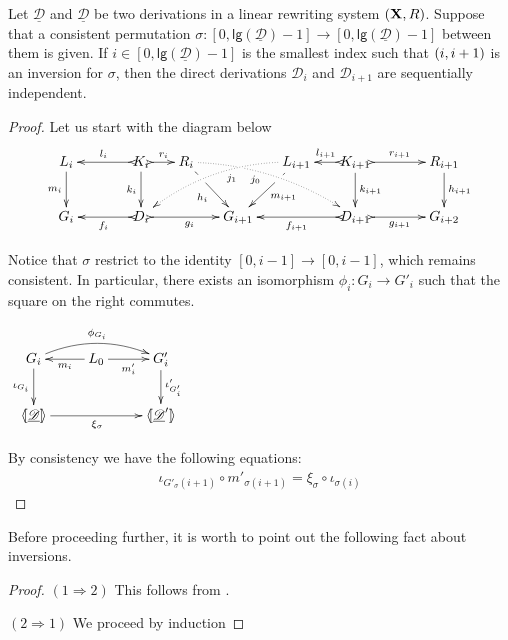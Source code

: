 \documentclass[a4paper,UKenglish,cleveref,pdftex, thm-restate,numberwithinsect,anonymous]{lipics}
\def\R{\mathsf{R}}
\def\X{\textbf {\textup{X}}}
\def\G{\textbf {\textup{G}}}
\newcommand{\dder}[1]{\mathscr{#1}}
\newcommand{\der}[1]{\underline{\dder{#1}}}
\newcommand{\lpro}{\langle \hspace{-1.85pt}[}
\newcommand{\rpro}{]\hspace{-1.85pt}\rangle}
\newcommand{\tpro}[1]{\lpro \der{#1}\rpro}
\newcommand{\lgh}[0]{\mathsf{lg}}
\begin{document}
\begin{lemma}
	Let $\der{D}$ and $\der{D}$ be two derivations in a linear rewriting system $(\X, \R)$. Suppose that a consistent permutation $\sigma:[0, \lgh(\der{D})-1]\to [0, \lgh(\der{D})-1]$ between them is given. If $i\in [0, \lgh(\der{D})-1]$ is the smallest index such that $\transp{i}$ is an inversion for $\sigma$, then the direct derivations $\dder{D}_i$ and $\dder{D}_{i+1}$ are sequentially independent.
\end{lemma}
\begin{proof}
	Let us start with the diagram below
	  \[\xymatrix@C=15pt{L_i \ar[d]_{m_i}&& K_i
		\ar[d]_{k_i}\ar@{>->}[ll]_{l_i} \ar@{>->}[r]^{r_i} & R_i
		\ar@{.>}@/^.35cm/[drrr]|(.3)\hole_(.4){j_0}
		\ar[dr]|(.3)\hole_{h_i} && L_{i+1} \ar@{.>}@/_.4cm/[dlll]^(.4){j_1}
		\ar[dl]|(.3)\hole^{m_{i+1}}& K_{i+1} \ar[d]^{k_{i+1}}\ar@{>->}[l]_{l_{i+1}}
		\ar@{>->}[rr]^{r_{i+1}} && R_{i+1} \ar[d]^{h_{i+1}}\\G_i && \ar@{>->}[ll]^{f_i}
		D_i \ar@{>->}[rr]_{g_i}&& G_{i+1} && \ar@{>->}[ll]^{f_{i+1}} D_{i+1}\ar@{>->}[rr]_{g_{i+1}}&& G_{i+2}}\]
	\parbox{9cm}{Notice that $\sigma$ restrict to the identity $[0, i-1]\to [0,i-1]$, which remains consistent. In particular, there exists an isomorphism $\phi_{i}\colon G_i\to G'_i$ such that the square on the right commutes.}
	\parbox{3cm}{\vspace{-.5cm}$\xymatrix{G_i \ar[d]_{\iota_{G_i}}\ar@/^.4cm/[rr]^{\phi_{G_i}}& L_0  \ar[l]^{m_i}\ar[r]_{m'_{i}} & G'_{i} \ar[d]^{\iota'_{G'_i}}\\ \tpro{D} \ar[rr]_{\xi_\sigma} & &\lpro\der{D}'\rpro  }$}
	
	
	
	
	By consistency we have the following equations:
	\[\begin{split}
		\iota_{G'_\sigma(i+1)}\circ m'_{\sigma(i+1)} =\xi_{\sigma}\circ \iota_{\sigma(i)}
	\end{split}\]
\end{proof}

\begin{remark}\label{rem:salvavita}
	Before proceeding further, it is worth to point out the following fact about inversions.
\end{remark}
\thmcoswitch*
\label{thmswitch-proof}
\begin{proof}$(1\Rightarrow 2)$ This follows from .

\smallskip \noindent $(2\Rightarrow 1)$ We proceed by induction
\end{proof}
\end{document}
